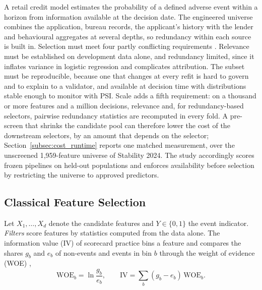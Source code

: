 \documentclass[final,5p,twocolumn]{elsarticle}
\begin{document}
A retail credit model estimates the probability of a defined adverse event within a horizon from information available at the decision date. The engineered universe combines the application, bureau records, the applicant's history with the lender and behavioural aggregates at several depths, so redundancy within each source is built in. Selection must meet four partly conflicting requirements \cite{siddiqi2006,thomas2002,yurdakul2020}. Relevance must be established on development data alone, and redundancy limited, since it inflates variance in logistic regression and complicates attribution. The subset must be reproducible, because one that changes at every refit is hard to govern and to explain to a validator, and available at decision time with distributions stable enough to monitor with PSI. Scale adds a fifth requirement: on a thousand or more features and a million decisions, relevance and, for redundancy-based selectors, pairwise redundancy statistics are recomputed in every fold. A pre-screen that shrinks the candidate pool can therefore lower the cost of the downstream selectors, by an amount that depends on the selector; Section~\ref{subsec:cost_runtime} reports one matched measurement, over the unscreened 1,959-feature universe of Stability 2024. The study accordingly scores frozen pipelines on held-out populations \cite{bergmeir2012} and enforces availability before selection by restricting the universe to approved predictors.

\subsection{Classical Feature Selection}
\label{subsec:classical_fs_background}

Let $X_1,\dots,X_d$ denote the candidate features and $Y\in\{0,1\}$ the event indicator. \emph{Filters} score features by statistics computed from the data alone. The information value (IV) of scorecard practice bins a feature and compares the shares $g_b$ and $e_b$ of non-events and events in bin $b$ through the weight of evidence (WOE) \cite{siddiqi2006},
\begin{equation}
    \mathrm{WOE}_b=\ln\frac{g_b}{e_b},\qquad
    \mathrm{IV}=\sum_{b}(g_b-e_b)\,\mathrm{WOE}_b .
    \label{eq:iv}
\end{equation}
\end{document}
